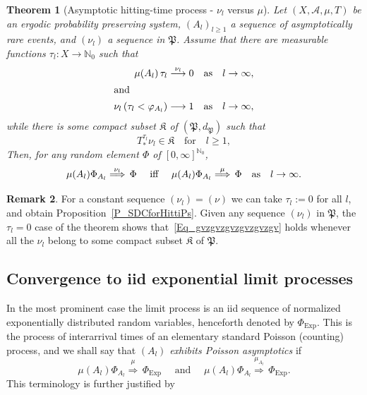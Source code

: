 \documentclass[10pt]{amsart}
\newtheorem{theo}{Theorem}[section]
\theoremstyle{definition}\newtheorem{defi}[theo]{Definition}\newtheorem{rema}[theo]{Remark}\newtheorem{exam}[theo]{Example}\newtheorem{exem}[theo]{Example}\newtheorem{nota}[theo]{Notation}
\newcommand{\clA}{\mathcal{A}}
\newcommand{\Expl}{\mathrm{Exp}}
\newcommand{\frkK}{\mathfrak{K}}
\newcommand{\frkP}{\mathfrak{P}}
\newcommand{\bbN}{\mathbb{N}}
\begin{document}
\begin{theo}[{Asymptotic hitting-time process - $\nu_{l}$ versus $\mu$}]\label{T_ProcessesAsymptoticToHittingTimeProc}
Let $(X,\clA,\mu,T)$ be an ergodic probability preserving system, $(A_{l})_{l\geq1}$ a sequence of asymptotically rare events, and $(\nu_{l})$ a sequence in $\frkP$. Assume that there are measurable functions $\tau_{l}:X\rightarrow
\bbN_{0}$ such that
\begin{align}
\mu(A_{l})\,\tau_{l}\overset{\nu_{l}}{\longrightarrow}0\quad &\text{as}\quad l\rightarrow\infty, \label{Eq_kllklklklklk}
\\
\intertext{and}
\nu_{l}\left(\tau_{l}<\varphi_{A_{l}}\right) \longrightarrow1\quad &\text{as}\quad l\rightarrow\infty,\label{Eq_opopopopo}
\end{align}
while there is some compact subset $\frkK$ of $(\frkP,d_{\frkP})$ such that
\begin{equation}\label{Eq_hbhbhbhbhbkkkk}
T_{\ast}^{\tau_{l}}\nu_{l}\in\frkK \quad\text{for}\quad l\geq1,
\end{equation}
Then, for any random element $\Phi$ of $[0,\infty]^{\bbN_{0}}$,
\begin{equation}\label{Eq_gvzgvzgvzgvzgvzgv}
\mu(A_{l})\Phi_{A_{l}}\overset{\nu_{l}}{\Longrightarrow}\,\Phi\quad\text{  iff
\quad}\mu(A_{l})\Phi_{A_{l}}\overset{\mu}{\Longrightarrow}\,\Phi\quad\text{as}\quad l\rightarrow\infty. 
\end{equation}
\end{theo}



\begin{rema}
For a constant sequence $(\nu_{l})=(\nu)$ we can take $\tau_{l}:=0$ for all
$l$, and obtain Proposition~\ref{P_SDCforHittiPs}. Given any sequence $(\nu_{l})$ in $\frkP$, the $\tau_{l}=0$ case of the theorem shows that~\eqref{Eq_gvzgvzgvzgvzgvzgv} holds whenever all the $\nu_{l}$ belong to some compact subset $\frkK$ of $\frkP$.
\end{rema}



\subsection{Convergence to iid exponential limit processes}
In the most prominent case the limit process is an iid sequence of normalized exponentially distributed random variables, henceforth denoted by $\Phi_{\Expl}$. This is the process of interarrival times of an elementary standard Poisson (counting) process, and we shall say that $(A_{l})$ \emph{exhibits Poisson asymptotics} if
\begin{equation}\label{Eq_DefPoissonAsymptotics}
\mu(A_{l})\Phi_{A_{l}}\overset{\mu}{\Longrightarrow}\,\Phi_{\Expl }\quad\text{  and }\quad\mu(A_{l})\Phi_{A_{l}}\overset{\mu_{A_{l}} }{\Longrightarrow}\,\Phi_{\Expl}.
\end{equation}
This terminology is further justified by
\end{document}
